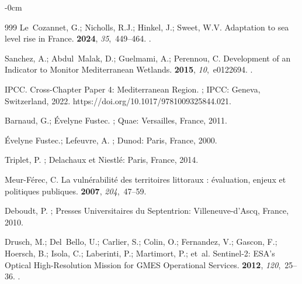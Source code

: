 \documentclass[coasts,article,accept,pdftex,moreauthors]{Definitions/mdpi}
\begin{document}
\begin{adjustwidth}{-\extralength}{0cm}
\begin{thebibliography}{999}
Le~Cozannet, G.; Nicholls, R.J.; Hinkel, J.; Sweet, W.V.
\newblock Adaptation to sea level rise in {France}.
 {\bf 2024}, {\em
  35},~449--464.
.

Sanchez, A.; Abdul~Malak, D.; Guelmami, A.; Perennou, C.
\newblock Development of an Indicator to Monitor {Mediterranean} Wetlands.
 {\bf 2015}, {\em 10},~e0122694.
.

{IPCC}.
\newblock Cross-Chapter Paper 4: {Mediterranean} Region.
; IPCC: Geneva, Switzerland, {
  2022}.
\newblock https://doi.org/10.1017/9781009325844.021.

Barnaud, G.; Évelyne Fustec.
; Quae:
  Versailles, France,  2011.

Évelyne Fustec.; Lefeuvre, A.
; Dunod: Paris, France,   2000.

Triplet, P.
; Delachaux et
  Niestlé: Paris, France,   2014.

Meur-Férec, C.
\newblock La vulnérabilité des territoires littoraux : évaluation, enjeux et
  politiques publiques.
 {\bf 2007}, {\em 204},~47--59.

Deboudt, P.
; Presses Universitaires du
  Septentrion: Villeneuve-d'Ascq, France, 2010.

Drusch, M.; Del~Bello, U.; Carlier, S.; Colin, O.; Fernandez, V.; Gascon, F.;
  Hoersch, B.; Isola, C.; Laberinti, P.; Martimort, P.; et~al.
\newblock Sentinel-2: {ESA}'s Optical High-Resolution Mission for {GMES}
  Operational Services.
 {\bf 2012}, {\em 120},~25--36.
.


\end{thebibliography}
\end{adjustwidth}
\end{document}
